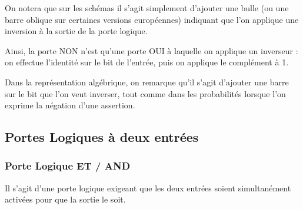 \documentclass[11pt,a4paper]{article}
\begin{document}
On notera que sur les schémas il s'agit simplement d'ajouter une bulle (ou une barre oblique sur certaines versions européennes) indiquant que l'on applique une inversion à la sortie de la porte logique.

Ainsi, la porte NON n'est qu'une porte OUI à laquelle on applique un inverseur : on effectue l'identité sur le bit de l'entrée, puis on applique le complément à 1.

Dans la représentation algébrique, on remarque qu'il s'agit d'ajouter une barre sur le bit que l'on veut inverser, tout comme dans les probabilités lorsque l'on exprime la négation d'une assertion.


\clearpage


\subsection{Portes Logiques à deux entrées}

\subsubsection{Porte Logique ET / AND}

Il s'agit d'une porte logique exigeant que les deux entrées soient simultanément activées pour que la sortie le soit.

\medskip
\end{document}
